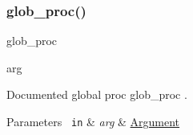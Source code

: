 \subsubsection{\texorpdfstring{glob\_proc()}{glob\_proc()}}
{\footnotesize\ttfamily glob\+\_\+proc\begin{DoxyParamCaption}\item[{}]{arg  }\end{DoxyParamCaption}}

Documented global proc {\ttfamily glob\+\_\+proc} . 
\begin{DoxyParams}[1]{Parameters}
\mbox{\texttt{ in}}  & {\em arg} & \mbox{\hyperlink{struct_argument}{Argument}} \\
\hline
\end{DoxyParams}

